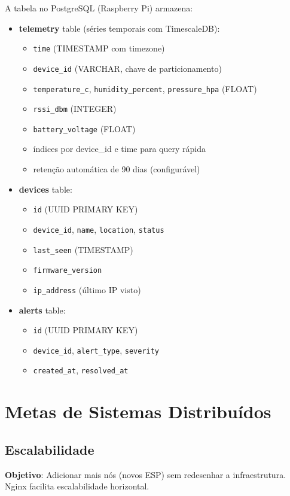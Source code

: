 \documentclass[12pt,a4paper,oneside]{report}
\begin{document}
A tabela no PostgreSQL (Raspberry Pi) armazena:

\begin{itemize}[leftmargin=1.2cm]
    \item \textbf{telemetry} table (séries temporais com TimescaleDB):
    \begin{itemize}
        \item \texttt{time} (TIMESTAMP com timezone)
        \item \texttt{device\_id} (VARCHAR, chave de particionamento)
        \item \texttt{temperature\_c}, \texttt{humidity\_percent}, \texttt{pressure\_hpa} (FLOAT)
        \item \texttt{rssi\_dbm} (INTEGER)
        \item \texttt{battery\_voltage} (FLOAT)
        \item índices por device\_id e time para query rápida
        \item retenção automática de 90 dias (configurável)
    \end{itemize}
    \item \textbf{devices} table:
    \begin{itemize}
        \item \texttt{id} (UUID PRIMARY KEY)
        \item \texttt{device\_id}, \texttt{name}, \texttt{location}, \texttt{status}
        \item \texttt{last\_seen} (TIMESTAMP)
        \item \texttt{firmware\_version}
        \item \texttt{ip\_address} (último IP visto)
    \end{itemize}
    \item \textbf{alerts} table:
    \begin{itemize}
        \item \texttt{id} (UUID PRIMARY KEY)
        \item \texttt{device\_id}, \texttt{alert\_type}, \texttt{severity}
        \item \texttt{created\_at}, \texttt{resolved\_at}
    \end{itemize}
\end{itemize}

\chapter{Metas de Sistemas Distribuídos}

\section{Escalabilidade}
\textbf{Objetivo}: Adicionar mais nós (novos ESP) sem redesenhar a infraestrutura. Nginx facilita escalabilidade horizontal.
\end{document}
